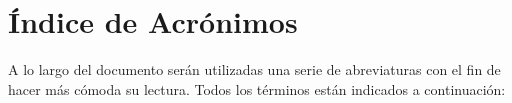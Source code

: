 \chapter*{Índice de Acrónimos}
\label{acronimos}


A lo largo del documento serán utilizadas una serie de abreviaturas con el fin de
hacer más cómoda su lectura. Todos los términos están indicados a continuación: 

